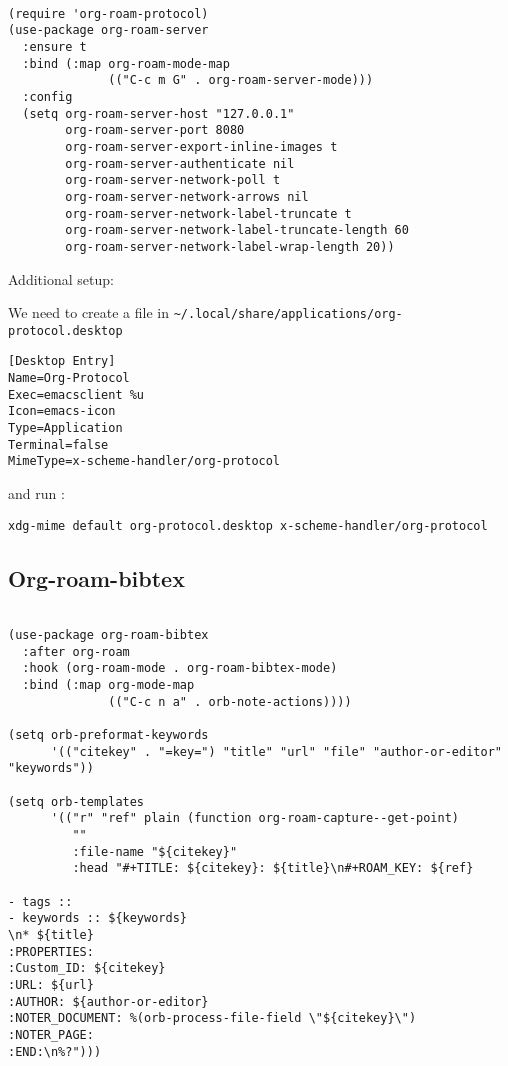 \documentclass[12pt]{article}
\begin{document}
\begin{verbatim}

(require 'org-roam-protocol)
(use-package org-roam-server
  :ensure t
  :bind (:map org-roam-mode-map
              (("C-c m G" . org-roam-server-mode)))
  :config
  (setq org-roam-server-host "127.0.0.1"
        org-roam-server-port 8080
        org-roam-server-export-inline-images t
        org-roam-server-authenticate nil
        org-roam-server-network-poll t
        org-roam-server-network-arrows nil
        org-roam-server-network-label-truncate t
        org-roam-server-network-label-truncate-length 60
        org-roam-server-network-label-wrap-length 20))
\end{verbatim}

Additional setup:

We need to create a file in \texttt{\textasciitilde{}/.local/share/applications/org-protocol.desktop}
\begin{verbatim}
[Desktop Entry]
Name=Org-Protocol
Exec=emacsclient %u
Icon=emacs-icon
Type=Application
Terminal=false
MimeType=x-scheme-handler/org-protocol
\end{verbatim}

and run :
\begin{verbatim}
xdg-mime default org-protocol.desktop x-scheme-handler/org-protocol
\end{verbatim}
\subsection{Org-roam-bibtex}
\label{sec:org4a2588f}
\begin{verbatim}

(use-package org-roam-bibtex
  :after org-roam
  :hook (org-roam-mode . org-roam-bibtex-mode)
  :bind (:map org-mode-map
              (("C-c n a" . orb-note-actions))))

(setq orb-preformat-keywords
      '(("citekey" . "=key=") "title" "url" "file" "author-or-editor" "keywords"))

(setq orb-templates
      '(("r" "ref" plain (function org-roam-capture--get-point)
         ""
         :file-name "${citekey}"
         :head "#+TITLE: ${citekey}: ${title}\n#+ROAM_KEY: ${ref}

- tags ::
- keywords :: ${keywords}
\n* ${title}
:PROPERTIES:
:Custom_ID: ${citekey}
:URL: ${url}
:AUTHOR: ${author-or-editor}
:NOTER_DOCUMENT: %(orb-process-file-field \"${citekey}\")
:NOTER_PAGE:
:END:\n%?")))

\end{verbatim}
\end{document}
